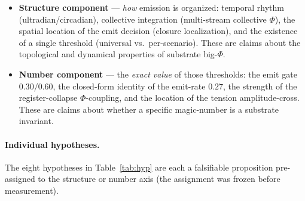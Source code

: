 \documentclass[11pt,a4paper]{article}
\begin{document}
\begin{itemize}
  \item \textbf{Structure component} --- \emph{how} emission is organized:
    temporal rhythm (ultradian/circadian), collective integration
    (multi-stream collective $\Phi$), the spatial location of the emit
    decision (closure localization), and the existence of a single threshold
    (universal vs.\ per-scenario). These are claims about the topological and
    dynamical properties of substrate big-$\Phi$.
  \item \textbf{Number component} --- the \emph{exact value} of those
    thresholds: the emit gate $0.30/0.60$, the closed-form identity of the
    emit-rate $0.27$, the strength of the register-collapse $\Phi$-coupling,
    and the location of the tension amplitude-cross. These are claims about
    whether a specific magic-number is a substrate invariant.
\end{itemize}

\paragraph{Individual hypotheses.} The eight hypotheses in
Table~\ref{tab:hyp} are each a falsifiable proposition pre-assigned to the
structure or number axis (the assignment was frozen before measurement).
\end{document}
